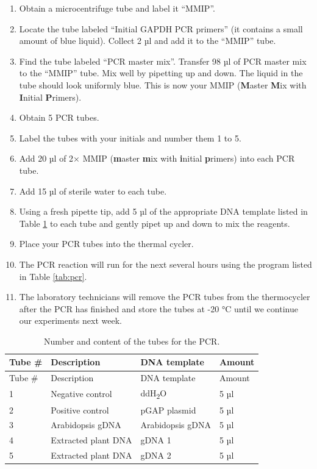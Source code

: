 \documentclass[]{book}
\providecommand{\tightlist}{%
  \setlength{\itemsep}{0pt}\setlength{\parskip}{0pt}}
\begin{document}
\begin{enumerate}
\def\labelenumi{\arabic{enumi}.}
\tightlist
\item
  Obtain a microcentrifuge tube and label it ``MMIP''.
\item
  Locate the tube labeled ``Initial GAPDH PCR primers'' (it contains a small amount of blue liquid). Collect 2 µl and add it to the ``MMIP'' tube.
\item
  Find the tube labeled ``PCR master mix''. Transfer 98 µl of PCR master mix to the ``MMIP'' tube. Mix well by pipetting up and down. The liquid in the tube should look uniformly blue. This is now your MMIP (\textbf{M}aster \textbf{M}ix with \textbf{I}nitial \textbf{P}rimers).
\item
  Obtain 5 PCR tubes.
\item
  Label the tubes with your initials and number them 1 to 5.
\item
  Add 20 µl of 2× MMIP (\textbf{m}aster \textbf{m}ix with \textbf{i}nitial \textbf{p}rimers) into each PCR tube.
\item
  Add 15 µl of sterile water to each tube.
\item
  Using a fresh pipette tip, add 5 µl of the appropriate DNA template listed in Table \ref{tab:tubes} to each tube and gently pipet up and down to mix the reagents.
\item
  Place your PCR tubes into the thermal cycler.
\item
  The PCR reaction will run for the next several hours using the program listed in Table \ref{tab:pcr}.
\item
  The laboratory technicians will remove the PCR tubes from the thermocycler after the PCR has finished and store the tubes at -20 °C until we continue our experiments next week.
\end{enumerate}

\begin{longtable}[]{@{}llll@{}}
\caption{\label{tab:tubes} Number and content of the tubes for the PCR.}\tabularnewline
\toprule
Tube \# & Description & DNA template & Amount\tabularnewline
\midrule
\endfirsthead
\toprule
Tube \# & Description & DNA template & Amount\tabularnewline
\midrule
\endhead
1 & Negative control & ddH\textsubscript{2}O & 5 µl\tabularnewline
2 & Positive control & pGAP plasmid & 5 µl\tabularnewline
3 & Arabidopsis gDNA & Arabidopsis gDNA & 5 µl\tabularnewline
4 & Extracted plant DNA & gDNA 1 & 5 µl\tabularnewline
5 & Extracted plant DNA & gDNA 2 & 5 µl\tabularnewline
\bottomrule
\end{longtable}
\end{document}
